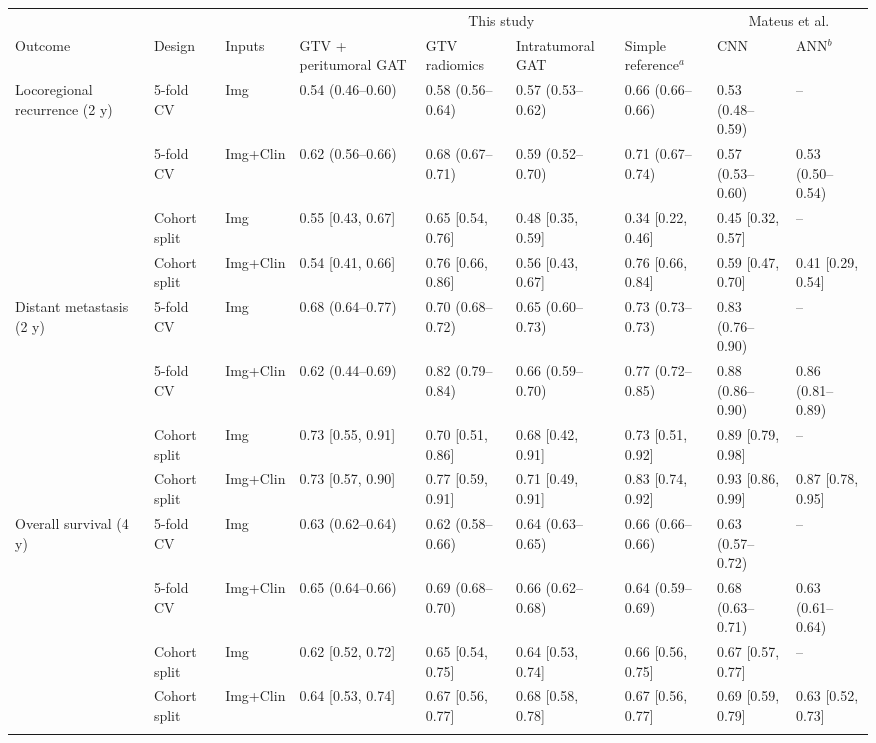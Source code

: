 \begin{tabular}{@{}lllllllll@{}}
\toprule
 & & & \multicolumn{4}{c}{This study} & \multicolumn{2}{c}{Mateus et al.} \\
\cmidrule(lr){4-7}\cmidrule(lr){8-9}
Outcome & Design & Inputs & GTV + peritumoral GAT & GTV radiomics & Intratumoral GAT & Simple reference$^{a}$ & CNN & ANN$^{b}$ \\
\midrule
Locoregional recurrence (2 y) & 5-fold CV & Img & 0.54 (0.46--0.60) & 0.58 (0.56--0.64) & 0.57 (0.53--0.62) & 0.66 (0.66--0.66) & 0.53 (0.48--0.59) & -- \\
 & 5-fold CV & Img+Clin & 0.62 (0.56--0.66) & 0.68 (0.67--0.71) & 0.59 (0.52--0.70) & 0.71 (0.67--0.74) & 0.57 (0.53--0.60) & 0.53 (0.50--0.54) \\
 & Cohort split & Img & 0.55 [0.43, 0.67] & 0.65 [0.54, 0.76] & 0.48 [0.35, 0.59] & 0.34 [0.22, 0.46] & 0.45 [0.32, 0.57] & -- \\
 & Cohort split & Img+Clin & 0.54 [0.41, 0.66] & 0.76 [0.66, 0.86] & 0.56 [0.43, 0.67] & 0.76 [0.66, 0.84] & 0.59 [0.47, 0.70] & 0.41 [0.29, 0.54] \\
\midrule
Distant metastasis (2 y) & 5-fold CV & Img & 0.68 (0.64--0.77) & 0.70 (0.68--0.72) & 0.65 (0.60--0.73) & 0.73 (0.73--0.73) & 0.83 (0.76--0.90) & -- \\
 & 5-fold CV & Img+Clin & 0.62 (0.44--0.69) & 0.82 (0.79--0.84) & 0.66 (0.59--0.70) & 0.77 (0.72--0.85) & 0.88 (0.86--0.90) & 0.86 (0.81--0.89) \\
 & Cohort split & Img & 0.73 [0.55, 0.91] & 0.70 [0.51, 0.86] & 0.68 [0.42, 0.91] & 0.73 [0.51, 0.92] & 0.89 [0.79, 0.98] & -- \\
 & Cohort split & Img+Clin & 0.73 [0.57, 0.90] & 0.77 [0.59, 0.91] & 0.71 [0.49, 0.91] & 0.83 [0.74, 0.92] & 0.93 [0.86, 0.99] & 0.87 [0.78, 0.95] \\
\midrule
Overall survival (4 y) & 5-fold CV & Img & 0.63 (0.62--0.64) & 0.62 (0.58--0.66) & 0.64 (0.63--0.65) & 0.66 (0.66--0.66) & 0.63 (0.57--0.72) & -- \\
 & 5-fold CV & Img+Clin & 0.65 (0.64--0.66) & 0.69 (0.68--0.70) & 0.66 (0.62--0.68) & 0.64 (0.59--0.69) & 0.68 (0.63--0.71) & 0.63 (0.61--0.64) \\
 & Cohort split & Img & 0.62 [0.52, 0.72] & 0.65 [0.54, 0.75] & 0.64 [0.53, 0.74] & 0.66 [0.56, 0.75] & 0.67 [0.57, 0.77] & -- \\
 & Cohort split & Img+Clin & 0.64 [0.53, 0.74] & 0.67 [0.56, 0.77] & 0.68 [0.58, 0.78] & 0.67 [0.56, 0.77] & 0.69 [0.59, 0.79] & 0.63 [0.52, 0.73] \\
\botrule
\end{tabular}
